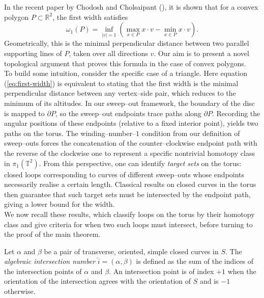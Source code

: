 In the recent paper by Chodosh and Cholsaipant (\cite{Chodosh25}), it is shown that for a convex polygon $P \subset \mathbb{R}^2$, the first width satisfies
\begin{equation}\label{eq:first-width}
    \omega_1(P) = \inf_{|v|=1} \left( \max_{x \in P} x \cdot v - \min_{x \in P} x \cdot v \right).
\end{equation}
Geometrically, this is the minimal perpendicular distance between two parallel supporting lines of $P$, taken over all directions $v$. Our aim is to present a novel topological argument that proves this formula in the case of convex polygons. \\
To build some intuition, consider the specific case of a triangle. Here equation (\ref{eq:first-width}) is equivalent to stating that the first width is the minimal perpendicular distance between any vertex–side pair, which reduces to the minimum of its altitudes. In our sweep–out framework, the boundary of the disc is mapped to $\partial P$, so the sweep–out endpoints trace paths along $\partial P$. Recording the angular positions of these endpoints (relative to a fixed interior point), yields two paths on the torus. The winding–number–$1$ condition from our definition of sweep–outs forces the concatenation of the counter–clockwise endpoint path with the reverse of the clockwise one to represent a specific nontrivial homotopy class in $\pi_1(\mathbb{T}^2)$. From this perspective, one can identify \emph{target sets} on the torus: closed loops corresponding to curves of different sweep--outs whose endpoints necessarily realise a certain length. Classical results on closed curves in the torus then guarantee that such target sets must be intersected by the endpoint path, giving a lower bound for the width.\\
We now recall these results, which classify loops on the torus by their homotopy class and give criteria for when two such loops must intersect, before turning to the proof of the main theorem.

\begin{definition}
Let $\alpha$ and $\beta$ be a pair of transverse, oriented, simple closed curves in $S$.
The \emph{algebraic intersection number} $\widehat{i}=(\alpha, \beta)$ is defined as the sum of the indices of the intersection points of $\alpha$ and $\beta$. An intersection point is of index $+1$ when the orientation of the intersection agrees with the orientation of $S$ and is $-1$ otherwise. 
\end{definition}

